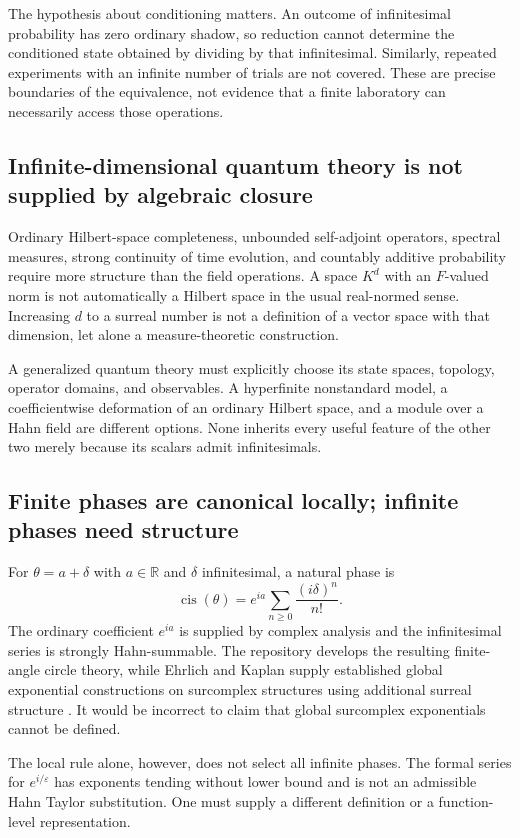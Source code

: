 \documentclass[11pt,a4paper]{article}
\numberwithin{equation}{section}
\theoremstyle{definition}
\theoremstyle{remark}
\newcommand{\R}{\mathbb R}
\newcommand{\eps}{\varepsilon}
\DeclareMathOperator{\cis}{cis}
\begin{document}
The hypothesis about conditioning matters. An outcome of infinitesimal probability has zero ordinary shadow, so reduction cannot determine the conditioned state obtained by dividing by that infinitesimal. Similarly, repeated experiments with an infinite number of trials are not covered. These are precise boundaries of the equivalence, not evidence that a finite laboratory can necessarily access those operations.

\subsection{Infinite-dimensional quantum theory is not supplied by algebraic closure}
Ordinary Hilbert-space completeness, unbounded self-adjoint operators, spectral measures, strong continuity of time evolution, and countably additive probability require more structure than the field operations. A space $K^d$ with an $F$-valued norm is not automatically a Hilbert space in the usual real-normed sense. Increasing $d$ to a surreal number is not a definition of a vector space with that dimension, let alone a measure-theoretic construction.

A generalized quantum theory must explicitly choose its state spaces, topology, operator domains, and observables. A hyperfinite nonstandard model, a coefficientwise deformation of an ordinary Hilbert space, and a module over a Hahn field are different options. None inherits every useful feature of the other two merely because its scalars admit infinitesimals.

\subsection{Finite phases are canonical locally; infinite phases need structure}
For $\theta=a+\delta$ with $a\in\R$ and $\delta$ infinitesimal, a natural phase is
\begin{equation}\label{eq:finitephase}
 \cis(\theta)=e^{ia}\sum_{n\geq0}\frac{(i\delta)^n}{n!}.
\end{equation}
The ordinary coefficient $e^{ia}$ is supplied by complex analysis and the infinitesimal series is strongly Hahn-summable. The repository develops the resulting finite-angle circle theory, while Ehrlich and Kaplan supply established global exponential constructions on surcomplex structures using additional surreal structure \cite{RepoTrig,EK}. It would be incorrect to claim that global surcomplex exponentials cannot be defined.

The local rule alone, however, does not select all infinite phases. The formal series for $e^{i/\eps}$ has exponents tending without lower bound and is not an admissible Hahn Taylor substitution. One must supply a different definition or a function-level representation.
\end{document}
